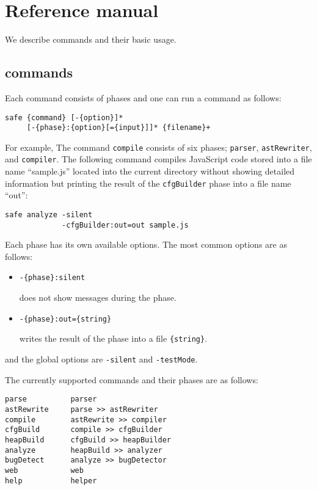\chapter{Reference manual}
\label{c:3:refman}

We describe \safe commands and their basic usage.

\section{\safe commands}
Each command consists of phases and one can run a \safe command as follows:
\begin{verbatim}
safe {command} [-{option}]*
     [-{phase}:{option}[={input}]]* {filename}+
\end{verbatim}
For example, The command \verb!compile! consists of six phases; 
\verb!parser!, \verb!astRewriter!, and \verb!compiler!.
The following command compiles JavaScript code stored into a file name
``{sample.js}'' located into the current directory without showing detailed
information but printing the result of the \verb!cfgBuilder!
phase into a file name ``{out}'':
\begin{verbatim}
safe analyze -silent
             -cfgBuilder:out=out sample.js
\end{verbatim}

Each phase has its own available options.
The most common options are as follows:
\begin{itemize}
\item \verb!-{phase}:silent!

\safe does not show messages during the phase.

\item \verb!-{phase}:out={string}!

\safe writes the result of the phase into a file \verb!{string}!.
\end{itemize}
and the global options are \verb!-silent! and \verb!-testMode!.

The currently supported commands and their phases are as follows:
\begin{verbatim}
parse          parser
astRewrite     parse >> astRewriter
compile        astRewrite >> compiler
cfgBuild       compile >> cfgBuilder
heapBuild      cfgBuild >> heapBuilder
analyze        heapBuild >> analyzer
bugDetect      analyze >> bugDetector
web            web
help           helper
\end{verbatim}

